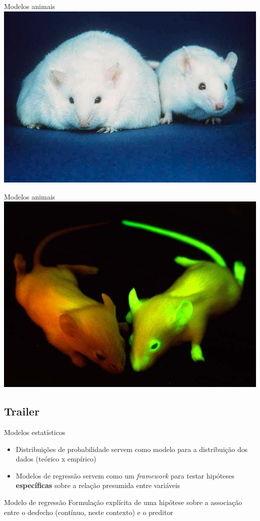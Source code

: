 \documentclass{beamer}
\begin{document}
\begin{frame}{Modelos animais}
  \centering
  \includegraphics[width=\textwidth]{Cap18-19/Fatmouse}
\end{frame}

\begin{frame}{Modelos animais}
  \centering
  \includegraphics[width=\textwidth]{Cap18-19/GFP_hiir}
\end{frame}

\subsection{Trailer}

\begin{frame}{Modelos estatísticos}
  \begin{itemize}
    \footnotesize
  \item Distribuições de probabilidade servem como modelo para a distribuição dos dados (teórico x empírico)
    \bigskip
  \item Modelos de regressão servem como um {\em framework} para testar hipóteses {\bf específicas} sobre a relação presumida entre variáveis
  \end{itemize}
  \vfill
  \begin{block}{Modelo de regressão}
    Formulação explícita de uma hipótese sobre a associação entre o desfecho (contínuo, neste contexto) e o preditor
  \end{block}
\end{frame}
\end{document}
